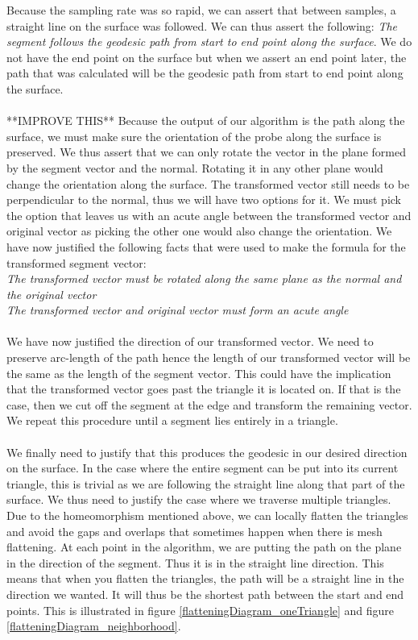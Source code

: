 Because the sampling rate was so rapid, we can assert that between samples, a straight line on the surface was followed. We can thus assert the following: {\it The segment follows the geodesic path from start to end point along the surface}. We do not have the end point on the surface but when we assert an end point later, the path that was calculated will be the geodesic path from start to end point along the surface. \\
\\
**IMPROVE THIS** Because the output of our algorithm is the path along the surface, we must make sure the orientation of the probe along the surface is preserved. We thus assert that we can only rotate the vector in the plane formed by the segment vector and the normal. Rotating it in any other plane would change the orientation along the surface. The transformed vector still needs to be perpendicular to the normal, thus we will have two options for it. We must pick the option that leaves us with an acute angle between the transformed vector and original vector as picking the other one would also change the orientation. We have now justified the following facts that were used to make the formula for the transformed segment vector: \\
{\it The transformed vector must be rotated along the same plane as the normal and the original vector}\\
{\it The transformed vector and original vector must form an acute angle}
\\
\\
We have now justified the direction of our transformed vector. We need to preserve arc-length of the path hence the length of our transformed vector will be the same as the length of the segment vector. This could have the implication that the transformed vector goes past the triangle it is located on. If that is the case, then we cut off the segment at the edge and transform the remaining vector. We repeat this procedure until a segment lies entirely in a triangle. \\
\\
We finally need to justify that this produces the geodesic in our desired direction on the surface. In the case where the entire segment can be put into its current triangle, this is trivial as we are following the straight line along that part of the surface. We thus need to justify the case where we traverse multiple triangles. Due to the homeomorphism mentioned above, we can locally flatten the triangles and avoid the gaps and overlaps that sometimes happen when there is mesh flattening. At each point in the algorithm, we are putting the path on the plane in the direction of the segment. Thus it is in the straight line direction. This means that when you flatten the triangles, the path will be a straight line in the direction we wanted. It will thus be the shortest path between the start and end points. This is illustrated in figure \ref{flatteningDiagram_oneTriangle} and figure \ref{flatteningDiagram_neighborhood}. 
